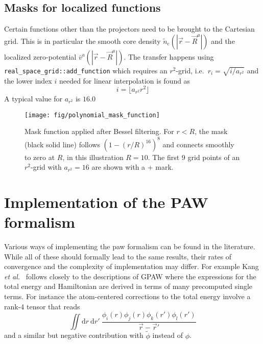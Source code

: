 \documentclass[oribibl]{llncs}
\newcommand{\m}[1]{{\mathrm{#1}}}
\newcommand{\um}[1]{_{\mathrm{#1}}}
\newcommand{\ttt}[1]{\texttt{#1}}
\begin{document}
\subsection{Masks for localized functions}
%
Certain functions other than the projectors 
need to be brought to the Cartesian grid.
This is in particular 
the smooth core density $\tilde n\um{c}(|\vec r - \vec R^a|)$ and 
the localized zero-potential  $\bar v^a(|\vec r - \vec R^a|)$.
The transfer happens using \ttt{real\_space\_grid::add\_function}
which requires an $r^2$-grid, i.e.~$r_i = \sqrt{i/a_{r^2}}$ and
the lower index $i$ needed for linear interpolation is found as
$$ i = \lfloor a_{r^2} r^2 \rfloor $$
A typical value for $a_{r^2}$ is $16.0$

\begin{figure} [ht]
  \centering
  \begin{minipage}[c]{.990\textwidth}
	\texttt{[image: fig/polynomial\_mask\_function]} %
  \end{minipage}\hfill
  \begin{minipage}[c]{.009\textwidth}
  \end{minipage}
  \caption{Mask function applied after Bessel filtering.
  For $r < R$, the mask (black solid line) follows $(1 - (r/R)^{16})^8$ 
  and connects smoothly to zero at $R$, in this illustration $R = 10$.
  The first 9 grid points of an $r^2$-grid with $a_{r^2}=16$ are shown with a + mark.
  } \label{fig:mask_function}
\end{figure}


\clearpage

\section{Implementation of the PAW formalism} \label{sec:paw-theory}
%
Various ways of implementing the \ac{paw} formalism can be found in the literature.
While all of these should formally lead to the same results,
their rates of convergence and the complexity of implementation may differ.
For example Kang \emph{et al.}~ \cite{Kang2016}
follows closely to the descriptions of GPAW \cite{Rostgaard-paw-note}
where the expressions for the total energy and Hamiltonian are derived
in terms of many precomputed single terms.
For instance the atom-centered corrections to the total energy
involve a rank-4 tensor that reads
\begin{equation}
	\iint \m dr \ \m dr' \   \frac{ \phi_i(r) \phi_j(r) \phi_k(r') \phi_l(r') }{\vec r - \vec r'}
\end{equation}
and a similar but negative contribution with $\tilde \phi$ instead of $\phi$.
\end{document}
